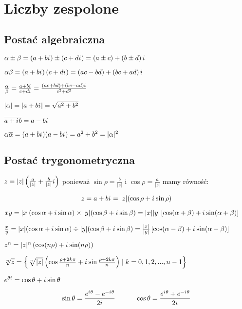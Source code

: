 \documentclass[a5paper,8pt]{extarticle}
\newcommand{\mi}{{i\mkern1mu}}
\begin{document}
\section{Liczby zespolone}

\subsection{Postać algebraiczna}

\begin{multicols}{2}
\begin{description}
	\item $ \alpha \pm \beta = \left( a + b\mi \right) \pm \left( c + d\mi \right) 
	= \left( a \pm c \right) + \left( b \pm d \right)\mi$
	\item $ \alpha\beta = \left( a + b\mi \right) \left( c + d\mi \right) 
	= \left( ac - bd \right) + \left( bc + ad \right)\mi$
	\item $ \frac{\alpha}{\beta} = \frac{a + b\mi}{c + d\mi} = \frac{(ac + bd) + (bc - ad)\mi}{c^2 + d^2} $
	\item[Norma] $ |\alpha| = |a + b\mi| = \sqrt{a^2 + b^2} $
	\item[Sprzężenie] $ \overline{a + \mi b} = a - b\mi $
	\item $ \alpha\overline{\alpha} = (a + b\mi)(a - b\mi) = a^2 + b^2 = |\alpha|^2 $
\end{description}
\end{multicols}

\subsection{Postać trygonometryczna}

$ z = |z|\left( \frac{a}{|z|} + \frac{b}{|z|}\mi \right) $ ponieważ $ \sin\rho = \frac{b}{|z|} $ i $ \cos\rho = \frac{a}{|z|} $ mamy równość:

$$ z = a + b\mi = |z|(\cos\rho + \mi\sin\rho) $$

\begin{description}
\item $ xy = |x|(\cos \alpha + \mi\sin\alpha) \times |y|(\cos \beta + \mi\sin\beta) =
	|x||y|\left[\cos(\alpha + \beta) + \mi\sin(\alpha+\beta)\right]$

\item $ \frac{x}{y} = |x|(\cos \alpha + \mi\sin\alpha) \div |y|(\cos \beta + \mi\sin\beta) =
	\frac{|x|}{|y|}\left[\cos(\alpha - \beta) + \mi\sin(\alpha-\beta)\right]$

\item[Wzór de Moivre'a] $ z^n = |z|^n\left(\cos(n\rho) + \mi\sin(n\rho)\right) $

\item[Pierwiastki] $ \sqrt[n]{ z } = \left\{ \sqrt[n]{|z|} \left(\cos \frac{\rho + 2k\pi}{n} + \mi\sin \frac{\rho + 2k\pi}{n} \right) \mid k = 0, 1, 2, ..., n-1  \right\} $

\item[Wzór Eulera] $ e^{\theta\mi} = \cos\theta + \mi\sin\theta $

\end{description}

	$$ \sin\theta = \frac{e^{\mi\theta} - e^{-\mi\theta}}{2\mi} \quad\quad\quad 
	\cos\theta = \frac{e^{\mi\theta} + e^{-\mi\theta}}{2\mi} $$
\end{document}
